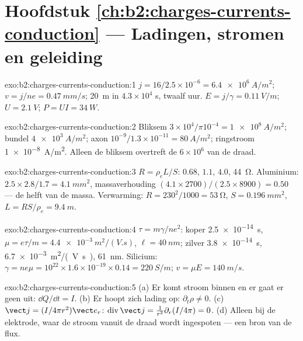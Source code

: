 \section*{Hoofdstuk \ref{ch:b2:charges-currents-conduction} --- Ladingen,
stromen en geleiding}

\begin{solution}{exo:b2:charges-currents-conduction:1}
$j = 16/2.5 \times 10^{-6} = \qty{6.4e6}{A/m^2}$;
$v = j/ne = \qty{0.47}{mm/s}$; \qty{20}{m} in $4.3 \times 10^4$ s, twaalf
uur. $E = j/\gamma = \qty{0.11}{V/m}$; $U = \qty{2.1}{V}$;
$P = UI = \qty{34}{W}$.
\end{solution}

\begin{solution}{exo:b2:charges-currents-conduction:2}
Bliksem $3 \times 10^4/\pi10^{-4} = \qty{1e8}{A/m^2}$; bundel
$\qty{4e3}{A/m^2}$; axon $10^{-9}/1.3 \times 10^{-11} = \qty{80}{A/m^2}$;
ringstroom \qty{1e-8}{A/m^2}. Alleen de bliksem overtreft de $6 \times 10^6$
van de draad.
\end{solution}

\begin{solution}{exo:b2:charges-currents-conduction:3}
$R = \rho_eL/S$: $0.68$, $1.1$, $4.0$, \qty{44}{\ohm}. Aluminium:
$2.5 \times 2.8/1.7 =
\qty{4.1}{mm^2}$, massaverhouding
$(4.1 \times 2700)/(2.5 \times 8900) = 0.50$ --- de helft van de massa.
Verwarming: $R = 230^2/1000 = \qty{53}{\ohm}$, $S = \qty{0.196}{mm^2}$,
$L = RS/\rho_e = \qty{9.4}{m}$.
\end{solution}

\begin{solution}{exo:b2:charges-currents-conduction:4}
$\tau = m\gamma/ne^2$: koper \qty{2.5e-14}{s},
$\mu = e\tau/m = \qty{4.4e-3}{m^2/(V.s)}$, $\ell = \qty{40}{nm}$; zilver
\qty{3.8e-14}{s}, \qty{6.7e-3}{m^2/(V.s)}, \qty{61}{nm}. Silicium:
$\gamma = ne\mu = 10^{22} \times 1.6 \times 10^{-19} \times 0.14 = \qty{220}{S/m}$;
$v =
\mu E = \qty{140}{m/s}$.
\end{solution}

\begin{solution}{exo:b2:charges-currents-conduction:5}
(a) Er komt stroom binnen en er gaat er geen uit: $\dd Q/\dd t = I$. (b) Er
hoopt zich lading op: $\partial_t
\rho \ne 0$. (c)
$\vect j = (I/4\pi r^2)\vect e_r$:
$\operatorname{div}\vect j = \frac1{r^2}
\partial_r(I/4\pi) = 0$. (d) Alleen
bij de elektrode, waar de stroom vanuit de draad wordt ingespoten --- een
bron van de flux.
\end{solution}

